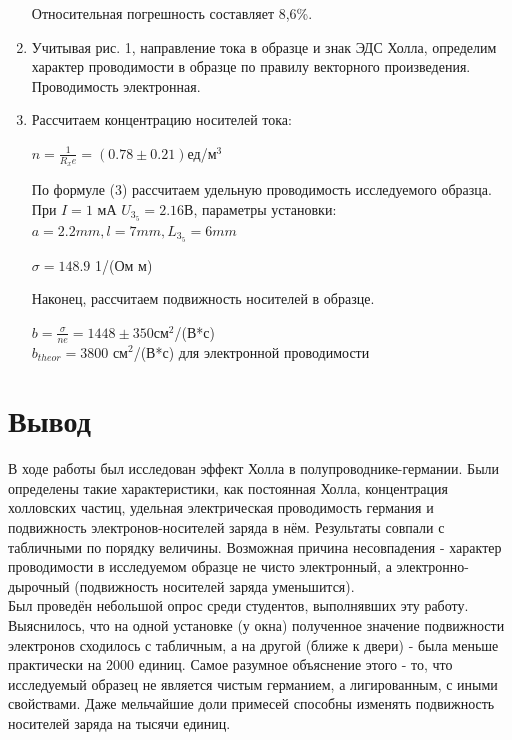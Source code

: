 \documentclass[a4paper]{article}
\begin{document}
\begin{enumerate}
Относительная погрешность составляет 8,6\%.

\item Учитывая рис. 1, направление тока в образце и знак ЭДС Холла, определим характер проводимости в образце по правилу векторного произведения. Проводимость электронная.

\item Рассчитаем концентрацию носителей тока:

\begin{center}
    $n = \frac{1}{R_x e} = (0.78 \pm 0.21)$ед/м$^3$
\end{center}

По формуле (3) рассчитаем удельную проводимость исследуемого образца. При $I = 1$ мА $U_3_5 = 2.16 $В, параметры установки: $a = 2.2mm, l = 7 mm, L_3_5 = 6 mm$
 \begin{center}
     $\sigma = 148.9$ 1/(Ом м)
 \end{center}
 
 Наконец, рассчитаем подвижность носителей в образце.
 \begin{center}
     $b = \frac{\sigma}{ne} = 1448 \pm 350 $см$^2$/(В*с) \\
     $b_{theor} = 3800$ см$^2$/(В*с) для электронной проводимости
 \end{center}
\end{enumerate}

\section{Вывод}

В ходе работы был исследован эффект Холла в полупроводнике-германии. Были определены такие характеристики, как постоянная Холла, концентрация холловских частиц, удельная электрическая проводимость германия и подвижность электронов-носителей заряда в нём. Результаты совпали с табличными по порядку величины. Возможная причина несовпадения - характер проводимости в исследуемом образце не чисто электронный, а электронно-дырочный (подвижность носителей заряда уменьшится). \\
Был проведён небольшой опрос среди студентов, выполнявших эту работу. Выяснилось, что на одной установке (у окна) полученное значение подвижности электронов сходилось с табличным, а на другой (ближе к двери) - была меньше практически на 2000 единиц. Самое разумное объяснение этого - то, что исследуемый образец не является чистым германием, а лигированным, с иными свойствами. Даже мельчайшие доли примесей способны изменять подвижность носителей заряда на тысячи единиц.
\end{document}
